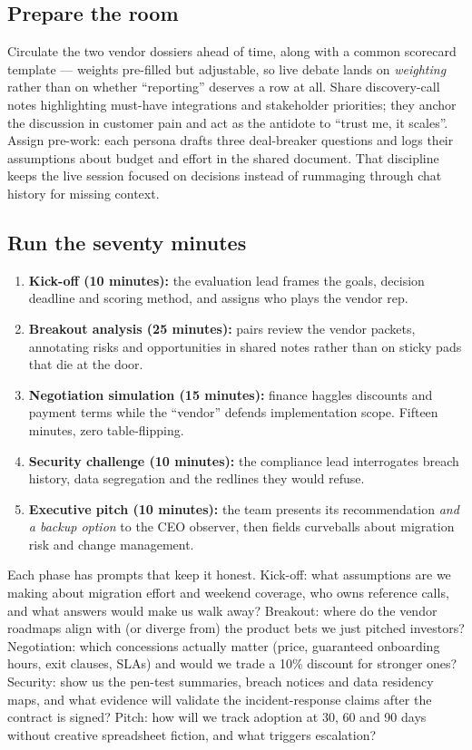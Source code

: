 \subsection{Prepare the room}


Circulate the two vendor dossiers ahead of time, along with a common scorecard template — weights pre-filled but adjustable, so live debate lands on \emph{weighting} rather than on whether ``reporting'' deserves a row at all. Share discovery-call notes highlighting must-have integrations and stakeholder priorities; they anchor the discussion in customer pain and act as the antidote to ``trust me, it scales''. Assign pre-work: each persona drafts three deal-breaker questions and logs their assumptions about budget and effort in the shared document. That discipline keeps the live session focused on decisions instead of rummaging through chat history for missing context.



\subsection{Run the seventy minutes}


\begin{enumerate}[leftmargin=*]
\item \textbf{Kick-off (10 minutes):} the evaluation lead frames the goals, decision deadline and scoring method, and assigns who plays the vendor rep.
\item \textbf{Breakout analysis (25 minutes):} pairs review the vendor packets, annotating risks and opportunities in shared notes rather than on sticky pads that die at the door.
\item \textbf{Negotiation simulation (15 minutes):} finance haggles discounts and payment terms while the ``vendor'' defends implementation scope. Fifteen minutes, zero table-flipping.
\item \textbf{Security challenge (10 minutes):} the compliance lead interrogates breach history, data segregation and the redlines they would refuse.
\item \textbf{Executive pitch (10 minutes):} the team presents its recommendation \emph{and a backup option} to the CEO observer, then fields curveballs about migration risk and change management.
\end{enumerate}

Each phase has prompts that keep it honest. Kick-off: what assumptions are we making about migration effort and weekend coverage, who owns reference calls, and what answers would make us walk away? Breakout: where do the vendor roadmaps align with (or diverge from) the product bets we just pitched investors? Negotiation: which concessions actually matter (price, guaranteed onboarding hours, exit clauses, SLAs) and would we trade a 10\% discount for stronger ones? Security: show us the pen-test summaries, breach notices and data residency maps, and what evidence will validate the incident-response claims after the contract is signed? Pitch: how will we track adoption at 30, 60 and 90 days without creative spreadsheet fiction, and what triggers escalation?



